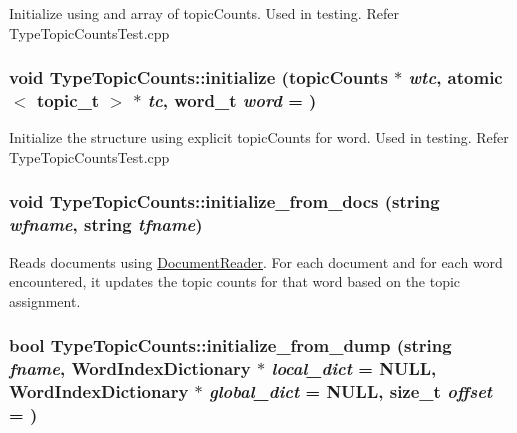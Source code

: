 \label{class_type_topic_counts_ab788633dc25d325dc47bd333b87ae574}
Initialize using and array of topicCounts. Used in testing. Refer TypeTopicCountsTest.cpp \hypertarget{class_type_topic_counts_a0f6527f9f996e4e39859a6cb266ebf12}{
\subsubsection[{initialize}]{\setlength{\rightskip}{0pt plus 5cm}void TypeTopicCounts::initialize ({\bf topicCounts} $\ast$ {\em wtc}, \/  atomic$<$ topic\_\-t $>$ $\ast$ {\em tc}, \/  word\_\-t {\em word} = {})}}
\label{class_type_topic_counts_a0f6527f9f996e4e39859a6cb266ebf12}
Initialize the structure using explicit topicCounts for word. Used in testing. Refer TypeTopicCountsTest.cpp \hypertarget{class_type_topic_counts_a1e51d6aa7ceb480b3b1e1a2e598a2486}{
\subsubsection[{initialize\_\-from\_\-docs}]{\setlength{\rightskip}{0pt plus 5cm}void TypeTopicCounts::initialize\_\-from\_\-docs (string {\em wfname}, \/  string {\em tfname})}}
\label{class_type_topic_counts_a1e51d6aa7ceb480b3b1e1a2e598a2486}
Reads documents using \hyperlink{class_document_reader}{DocumentReader}. For each document and for each word encountered, it updates the topic counts for that word based on the topic assignment. \hypertarget{class_type_topic_counts_a71ca87bf1f9cf612323f792594d3de29}{
\subsubsection[{initialize\_\-from\_\-dump}]{\setlength{\rightskip}{0pt plus 5cm}bool TypeTopicCounts::initialize\_\-from\_\-dump (string {\em fname}, \/  {\bf WordIndexDictionary} $\ast$ {\em local\_\-dict} = {\ttfamily NULL}, \/  {\bf WordIndexDictionary} $\ast$ {\em global\_\-dict} = {\ttfamily NULL}, \/  size\_\-t {\em offset} = {})}}
\label{class_type_topic_counts_a71ca87bf1f9cf612323f792594d3de29}
